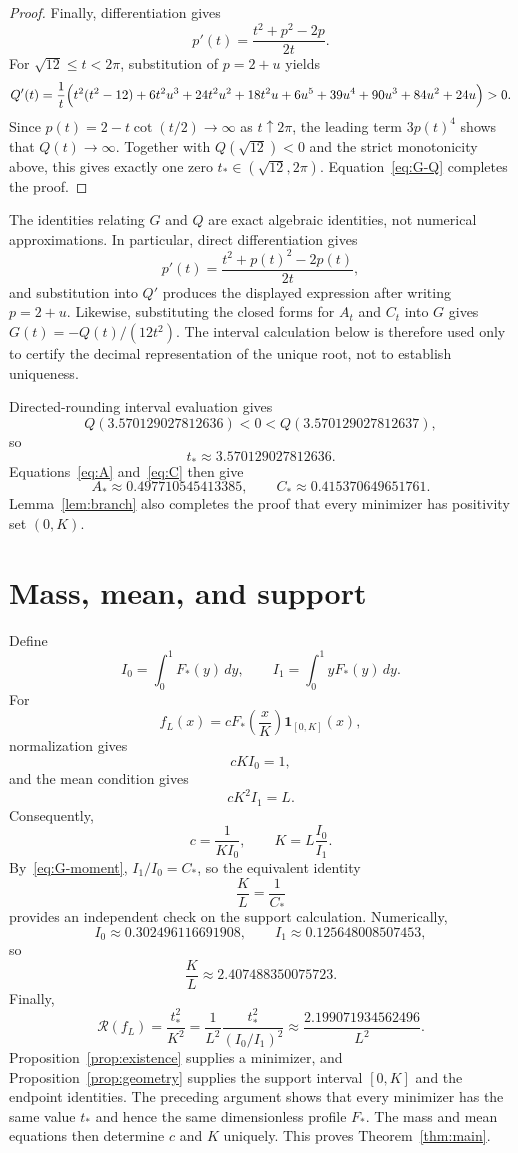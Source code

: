 \documentclass[11pt]{article}
\theoremstyle{definition}
\theoremstyle{remark}
\newcommand{\Rcal}{\mathcal R}
\begin{document}
\begin{proof}
Finally, differentiation gives
\[
 p'(t)=\frac{t^2+p^2-2p}{2t}.
\]
For $\sqrt{12}\leq t<2\pi$, substitution of $p=2+u$ yields
\[
 Q'(t)=\frac{1}{t}\Bigl(
 t^2(t^2-12)+6t^2u^3+24t^2u^2+18t^2u
 +6u^5+39u^4+90u^3+84u^2+24u
 \Bigr)>0.
\]
Since $p(t)=2-t\cot(t/2)\to\infty$ as $t\uparrow2\pi$, the leading term
$3p(t)^4$ shows that $Q(t)\to\infty$. Together with
$Q(\sqrt{12})<0$ and the strict monotonicity above, this gives exactly one
zero $t_*\in(\sqrt{12},2\pi)$. Equation~\eqref{eq:G-Q} completes the proof.
\end{proof}

The identities relating $G$ and $Q$ are exact algebraic identities, not numerical approximations. In particular, direct differentiation gives
\[
 p'(t)=\frac{t^2+p(t)^2-2p(t)}{2t},
\]
and substitution into $Q'$ produces the displayed expression after writing $p=2+u$. Likewise, substituting the closed forms for $A_t$ and $C_t$ into $G$ gives $G(t)=-Q(t)/(12t^2)$. The interval calculation below is therefore used only to certify the decimal representation of the unique root, not to establish uniqueness.

Directed-rounding interval evaluation gives
\[
 Q(3.570129027812636)<0
 <Q(3.570129027812637),
\]
so
\[
 t_*\approx3.570129027812636.
\]
Equations~\eqref{eq:A} and~\eqref{eq:C} then give
\[
 A_*\approx0.497710545413385,
 \qquad
 C_*\approx0.415370649651761.
\]
Lemma~\ref{lem:branch} also completes the proof that every minimizer has positivity set $(0,K)$.

\section{Mass, mean, and support}
Define
\[
 I_0=\int_0^1F_*(y)\,dy,
 \qquad
 I_1=\int_0^1yF_*(y)\,dy.
\]
For
\[
 f_L(x)=cF_*\!\left(\frac{x}{K}\right)\mathbf1_{[0,K]}(x),
\]
normalization gives
\[
 cKI_0=1,
\]
and the mean condition gives
\[
 cK^2I_1=L.
\]
Consequently,
\[
 c=\frac{1}{KI_0},
 \qquad
 K=L\frac{I_0}{I_1}.
\]
By~\eqref{eq:G-moment}, $I_1/I_0=C_*$, so the equivalent identity
\begin{equation}\label{eq:support-C}
 \frac{K}{L}=\frac{1}{C_*}
\end{equation}
provides an independent check on the support calculation.
Numerically,
\[
 I_0\approx0.302496116691908,
 \qquad
 I_1\approx0.125648008507453,
\]
so
\[
 \frac{K}{L}\approx2.407488350075723.
\]
Finally,
\[
 \Rcal(f_L)=\frac{t_*^2}{K^2}
 =\frac{1}{L^2}\frac{t_*^2}{(I_0/I_1)^2}
 \approx\frac{2.199071934562496}{L^2}.
\]
Proposition~\ref{prop:existence} supplies a minimizer, and
Proposition~\ref{prop:geometry} supplies the support interval $[0,K]$ and the
endpoint identities. The preceding argument shows that every minimizer has the same value $t_*$ and hence the same dimensionless profile $F_*$. The mass and mean equations then determine $c$ and $K$ uniquely. This proves Theorem~\ref{thm:main}.
\end{document}
